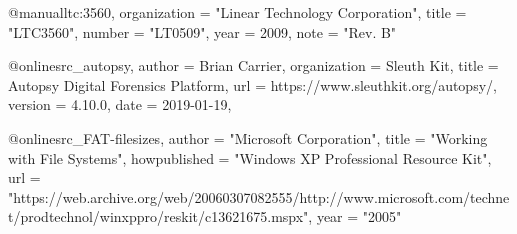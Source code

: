 










\iffalse
@manual{ltc:3560,
    organization  = "Linear Technology Corporation",
    title         = "LTC3560",
    number        = "LT0509",
    year          =  2009,
    note          = "Rev. B"
}

@online{src_autopsy,
  author = {Brian Carrier},
  organization = {Sleuth Kit},
  title = {Autopsy Digital Forensics Platform},
  url = {https://www.sleuthkit.org/autopsy/},
  version = {4.10.0},
  date = {2019-01-19},
}

@online{src_FAT-filesizes,
  author  = "Microsoft Corporation",
  title         = "Working with File Systems",
  howpublished  = "Windows XP Professional Resource Kit",
  url           = "https://web.archive.org/web/20060307082555/http://www.microsoft.com/technet/prodtechnol/winxppro/reskit/c13621675.mspx",
  year          = "2005"
}

